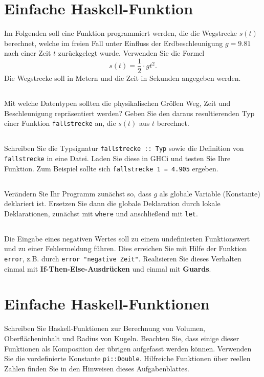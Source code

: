 \documentclass[
  10pt,                   %
  DIV12,
  german,                 %
  oneside,                %
  parskip=half,           %
  headings=normal,        %
  captions=tableheading,  %
]{scrartcl}
\begin{document}
\section{Einfache Haskell-Funktion}
Im Folgenden soll eine Funktion programmiert werden, die die
Wegstrecke $s(t)$ berechnet, welche im freien Fall unter Einfluss der Erdbeschleunigung $g = 9.81$ nach einer Zeit $t$ zurückgelegt wurde. Verwenden Sie die Formel 
\begin{displaymath}
s(t) = \frac{1}{2} \cdot gt^2.
\end{displaymath}
Die Wegstrecke soll in Metern und die Zeit in Sekunden angegeben werden.
\subsection{}
Mit welche Datentypen sollten die physikalischen Größen Weg, Zeit und Beschleunigung repräsentiert werden? Geben Sie den daraus resultierenden Typ einer Funktion \lstinline|fallstrecke| an, die $s(t)$ aus $t$ berechnet.
\subsection{}
Schreiben Sie die Typsignatur \lstinline|fallstrecke :: Typ| sowie die Definition von \lstinline|fallstrecke| in eine Datei. Laden Sie diese in GHCi und testen Sie Ihre Funktion. Zum Beispiel sollte sich \lstinline|fallstrecke 1 = 4.905| ergeben.
\subsection{}
Verändern Sie Ihr Programm zunächst so, dass $g$ als globale Variable (Konstante) deklariert ist. Ersetzen Sie dann die globale Deklaration durch lokale Deklarationen, zunächst mit \lstinline|where| und anschließend mit \lstinline|let|.
\subsection{}
Die Eingabe eines negativen Wertes soll zu einem undefinierten Funktionswert
und zu einer Fehlermeldung führen. Dies erreichen Sie mit Hilfe der Funktion
\lstinline|error|, z.B. durch \lstinline|error "negative Zeit"|. Realisieren Sie dieses Verhalten einmal mit \textbf{If-Then-Else-Ausdrücken} und einmal mit \textbf{Guards}.
\section{Einfache Haskell-Funktionen}
Schreiben Sie Haskell-Funktionen zur Berechnung von Volumen, Oberflächeninhalt und Radius von Kugeln. Beachten Sie, dass einige dieser Funktionen als Komposition der übrigen aufgefasst werden können. Verwenden Sie die vordefinierte Konstante \lstinline|pi::Double|.
Hilfreiche Funktionen über reellen Zahlen finden Sie in den Hinweisen dieses Aufgabenblattes.
\end{document}
